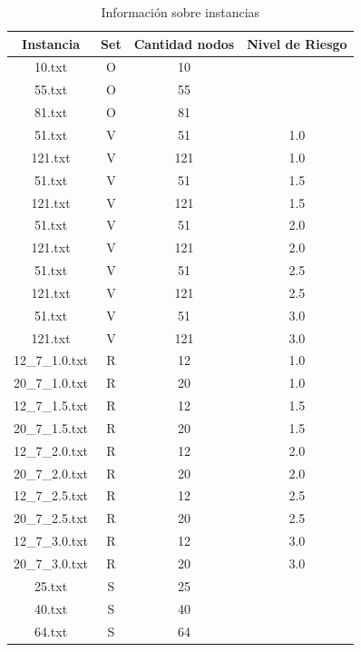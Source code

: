 \documentclass{article}
\begin{document}
\begin{table}[H]
    \centering
    \begin{tabular}{|c|c|c|c|}
    \hline
    Instancia      & Set & Cantidad nodos & Nivel de Riesgo \\ \hline
    10.txt         & O   & 10             &                 \\ \hline
    55.txt         & O   & 55             &                 \\ \hline
    81.txt         & O   & 81             &                 \\ \hline
    51.txt         & V   & 51             & 1.0             \\ \hline
    121.txt        & V   & 121            & 1.0             \\ \hline
    51.txt         & V   & 51             & 1.5             \\ \hline
    121.txt        & V   & 121            & 1.5             \\ \hline
    51.txt         & V   & 51             & 2.0             \\ \hline
    121.txt        & V   & 121            & 2.0             \\ \hline
    51.txt         & V   & 51             & 2.5             \\ \hline
    121.txt        & V   & 121            & 2.5             \\ \hline
    51.txt         & V   & 51             & 3.0             \\ \hline
    121.txt        & V   & 121            & 3.0             \\ \hline
    12\_7\_1.0.txt & R   & 12             & 1.0             \\ \hline
    20\_7\_1.0.txt & R   & 20             & 1.0             \\ \hline
    12\_7\_1.5.txt & R   & 12             & 1.5             \\ \hline
    20\_7\_1.5.txt & R   & 20             & 1.5             \\ \hline
    12\_7\_2.0.txt & R   & 12             & 2.0             \\ \hline
    20\_7\_2.0.txt & R   & 20             & 2.0             \\ \hline
    12\_7\_2.5.txt & R   & 12             & 2.5             \\ \hline
    20\_7\_2.5.txt & R   & 20             & 2.5             \\ \hline
    12\_7\_3.0.txt & R   & 12             & 3.0             \\ \hline
    20\_7\_3.0.txt & R   & 20             & 3.0             \\ \hline
    25.txt         & S   & 25             &                 \\ \hline
    40.txt         & S   & 40             &                 \\ \hline
    64.txt         & S   & 64             &                 \\ \hline
    \end{tabular}
    \caption{Información sobre instancias}
    \label{tab:info_instances}
\end{table}
\end{document}
